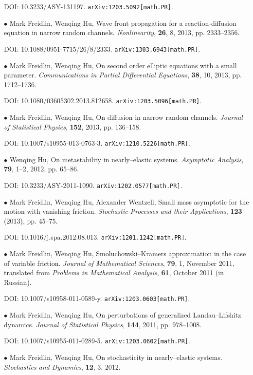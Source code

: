 \documentclass[margin,line]{res}
\begin{document}
\begin{resume}
DOI: 10.3233/ASY-131197. \verb"arXiv:1203.5092[math.PR]".


$\bullet$ Mark Freidlin, Wenqing Hu, Wave front propagation for a
reaction-diffusion equation in narrow random channels.
\textit{Nonlinearity}, \textbf{26}, 8, 2013, pp. 2333--2356. 

DOI: 10.1088/0951-7715/26/8/2333. \verb"arXiv:1303.6943[math.PR]".


$\bullet$ Mark Freidlin, Wenqing Hu, On second order elliptic
equations with a small parameter. \textit{Communications in Partial
Differential Equations}, \textbf{38}, 10, 2013, pp. 1712--1736.

DOI: 10.1080/03605302.2013.812658. \verb"arXiv:1203.5096[math.PR]".


$\bullet$ Mark Freidlin, Wenqing Hu, On diffusion in narrow random
channels. \textit{Journal of Statistical Physics}, \textbf{152},
2013, pp. 136--158.

DOI: 10.1007/s10955-013-0763-3. \verb"arXiv:1210.5226[math.PR]".


$\bullet$ Wenqing Hu, On metastability in nearly--elastic systems.
\textit{Asymptotic Analysis}, \textbf{79}, 1--2, 2012, pp. 65--86.

DOI: 10.3233/ASY-2011-1090. \verb"arXiv:1202.0577[math.PR]".


$\bullet$ Mark Freidlin, Wenqing Hu, Alexander Wentzell, Small mass
asymptotic for the motion with vanishing friction.
\textit{Stochastic Processes and their Applications}, \textbf{123}
(2013), pp. 45--75.

DOI: 10.1016/j.spa.2012.08.013. \verb"arXiv:1201.1242[math.PR]".


$\bullet$ Mark Freidlin, Wenqing Hu, Smoluchowski--Kramers
approximation in the case of variable friction. \textit{Journal of
Mathematical Sciences}, \textbf{79}, 1, November 2011, translated
from \textit{Problems in Mathematical Analysis}, \textbf{61},
October 2011 (in Russian).

DOI: 10.1007/s10958-011-0589-y. \verb"arXiv:1203.0603[math.PR]".


$\bullet$ Mark Freidlin, Wenqing Hu, On perturbations of generalized
Landau--Lifshitz dynamics. \textit{Journal of Statistical Physics},
\textbf{144}, 2011, pp. 978--1008.

DOI: 10.1007/s10955-011-0289-5. \verb"arXiv:1203.0602[math.PR]".


$\bullet$ Mark Freidlin, Wenqing Hu, On stochasticity in
nearly--elastic systems. \textit{Stochastics and Dynamics},
\textbf{12}, 3, 2012.


\end{resume}
\end{document}
